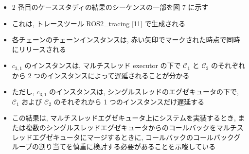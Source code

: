 \begin{frame}{}
    \begin{itemize}
        \item 2 番目のケーススタディの結果のシーケンスの一部を図 7 に示す
\item これは, トレースツール ROS2\_tracing [11] で生成される
\item 各チェーンのチェーンインスタンスは, 赤い矢印でマークされた時点で同時にリリースされる
\item $c_{3,1}$ のインスタンスは, マルチスレッド executor の下で $\mathcal{C}_{1}$ と $\mathcal{C}_{2}$ のそれぞれから 2 つのインスタンスによって遅延されることが分かる
\item ただし, $c_{3,1}$ のインスタンスは, シングルスレッドのエグゼキュータの下で, $\mathcal{C}_{1}$ および $\mathcal{C}_{2}$ のそれぞれから 1 つのインスタンスだけ遅延する
\item この結果は, マルチスレッドエグゼキュータ上にシステムを実装するとき, または複数のシングルスレッドエグゼキュータからのコールバックをマルチスレッドエグゼキュータにマージするときに, コールバックのコールバックグループの割り当てを慎重に検討する必要があることを示唆している
    \end{itemize}
\end{frame}
